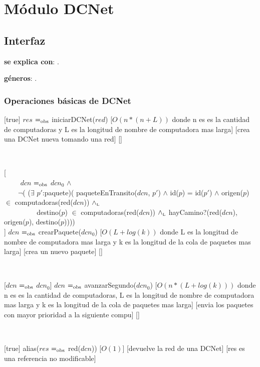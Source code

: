 \section{Módulo DCNet}

\subsection{Interfaz}

\textbf{se explica con}: .

\textbf{géneros}: .

\subsubsection{Operaciones básicas de DCNet}

[true]
{$res$ $=_{\mathrm{obs}}$ iniciarDCNet($red$)}
[$O(n * (n + L))$ donde n es es la cantidad de computadoras y L es la longitud de nombre de computadora mas larga]
[crea una DCNet nueva tomando una red]
[]

~

[\\ \- $\qquad$ $dcn$ $=_{\mathrm{obs}}$ $dcn_0$ $\land$
\\ \- $\qquad$$\neg$( ($\exists$ $p'$:paquete)(	paqueteEnTransito($dcn$, $p'$) $\land$ id($p$) = id($p'$) $\land$ origen($p$) $\in$ computadoras(red($dcn$)) $\land_{\mathrm{\scriptscriptstyle{L}}}$
\\ \- $\qquad$ \- $\qquad$ destino($p$) $\in$ computadoras(red($dcn$)) $\land_{\mathrm{\scriptscriptstyle{L}}}$ hayCamino?(red($dcn$), origen($p$), destino($p$)))) \\]
{$dcn$ $=_{\mathrm{obs}}$ crearPaquete($dcn_0$)}
[$O(L + log(k))$ donde L es la longitud de nombre de computadora mas larga y k es la longitud de la cola de paquetes mas larga]
[crea un nuevo paquete]
[]

~

[$dcn$ $=_{\mathrm{obs}}$ $dcn_0$]
{$dcn$ $=_{\mathrm{obs}}$ avanzarSegundo($dcn_0$)}
[$O(n * (L + log(k)))$ donde n es es la cantidad de computadoras, L es la longitud de nombre de computadora mas larga y k es la longitud de la cola de paquetes mas larga]
[envia los paquetes con mayor prioridad a la siguiente compu]
[]

~

[true]
{alias($res$ $=_{\mathrm{obs}}$ red($dcn$))}
[$O(1)$]
[devuelve la red de una DCNet]
[res es una referencia no modificable]

